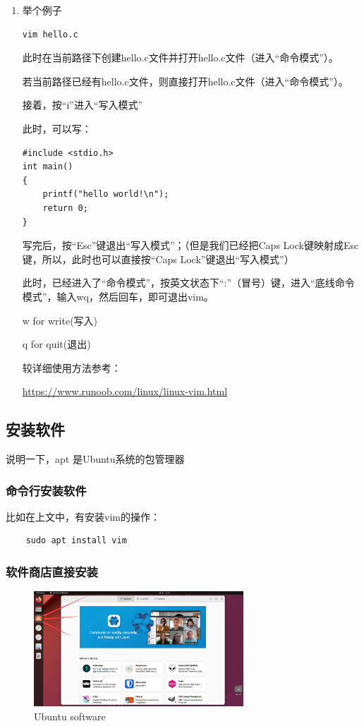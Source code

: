 \documentclass[12pt]{article}
\begin{document}
\begin{enumerate}
\item 举个例子

\begin{verbatim}
vim hello.c
\end{verbatim}

此时在当前路径下创建hello.c文件并打开hello.c文件（进入“命令模式”）。

若当前路径已经有hello.c文件，则直接打开hello.c文件（进入“命令模式”）。

接着，按“i”进入“写入模式”

此时，可以写：
\begin{verbatim}
#include <stdio.h>
int main()
{
    printf("hello world!\n");
    return 0;
}
\end{verbatim}

写完后，按“Esc”键退出“写入模式”；（但是我们已经把Caps Lock键映射成Esc键，所以，此时也可以直接按“Caps Lock”键退出“写入模式”）

此时，已经进入了“命令模式”，按英文状态下“:”（冒号）键，进入“底线命令模式”，输入wq，然后回车，即可退出vim。

w for write(写入)

q for quit(退出)


较详细使用方法参考：

\href{https://www.runoob.com/linux/linux-vim.html}{https://www.runoob.com/linux/linux-vim.html}

\end{enumerate}


\subsection{安装软件}

说明一下，apt 是Ubuntu系统的包管理器

\subsubsection{命令行安装软件}
比如在上文中，有安装vim的操作：

\begin{verbatim}
    sudo apt install vim
\end{verbatim}

\newpage
\subsubsection{软件商店直接安装}

\begin{figure}[hbt!]
    \centering
    \includegraphics[width=0.7\textwidth]{img/software.png}
    \caption{Ubuntu software}
\end{figure}
\end{document}
